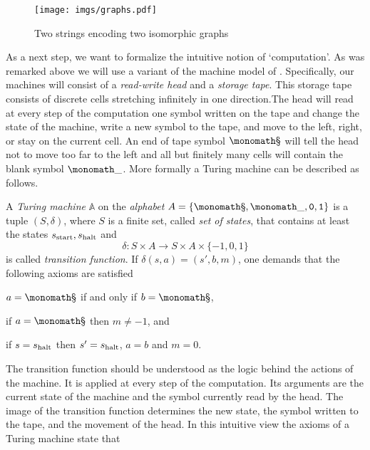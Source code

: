 \begin{center}
  \begin{figure}
    \texttt{[image: imgs/graphs.pdf]}
    \caption{Two strings encoding two isomorphic graphs}
    \label{fig:encoding of graphs}
  \end{figure}
\end{center}

As a next step, we want to formalize the intuitive notion of ‘computation’. As
was remarked above we will use a variant of the machine model of
\textcite{Turing1936}. Specifically, our machines will consist of a
\emph{read-write head} and a \emph{storage tape}. This storage tape consists of
discrete cells stretching infinitely in one direction.The head will read at
every step of the computation one symbol written on the tape and change the
state of the machine, write a new symbol to the tape, and move to the left,
right, or stay on the current cell. An end of tape symbol \(\sta\) will tell the
head not to move too far to the left and all but finitely many cells will
contain the blank symbol \(\emp\). More formally a Turing machine can be
described as follows.

\begin{defin}
  A \emph{Turing machine} \(\mathbb A\) on the \emph{alphabet} \(A = \lbrace \sta,
  \emp, \zer, \one \rbrace\) is a tuple \((S, δ)\), where \(S\) is a finite set,
  called \emph{set of states}, that contains at least the states \(s_{\text{start}},
  s_{\text{halt}}\) and
  \[
    δ: S × A → S × A × \lbrace -1, 0, 1 \rbrace
  \]
  is called \emph{transition function}. If \(δ(s, a) = (s', b, m)\), one
  demands that the following axioms are satisfied

  \begin{thmlist}
  \item
    \(a = \sta\) if and only if \(b = \sta\),
  \item
    if \(a = \sta\) then \(m ≠ -1\), and
  \item
    if \(s = s_{\text{halt}}\) then \(s' = s_{\text{halt}}\), \(a = b\) and \(m = 0\).
  \end{thmlist}
\end{defin}

The transition function should be understood as the logic behind the actions of
the machine. It is applied at every step of the computation. Its arguments are
the current state of the machine and the symbol currently read by the head. The
image of the transition function determines the new state, the symbol written to
the tape, and the movement of the head. In this intuitive view the axioms of a
Turing machine state that

